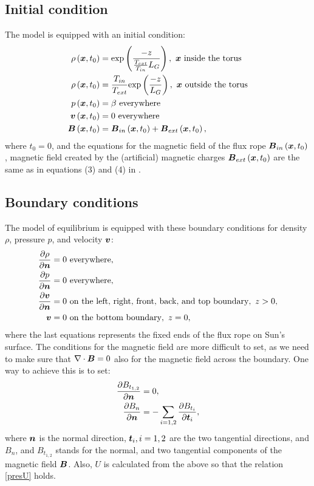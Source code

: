 \subsection{Initial condition}
The model is equipped with an initial condition:
\begin{align}
\label{tdIc}
\rho\left(\mbox{\boldmath $x$}, t_0\right) & = \mathrm{exp}\left(\frac{-z}{\frac{ T_{ext} }{T_{in}}L_G}\right),\ \mbox{\boldmath $x$}\ \text{inside the torus}\\
\rho\left(\mbox{\boldmath $x$}, t_0\right) & = \frac{ T_{in} }{T_{ext}} \mathrm{exp}\left(\frac{-z}{L_G}\right),\ \mbox{\boldmath $x$}\ \text{outside the torus}\\
p\left(\mbox{\boldmath $x$}, t_0\right) & = \beta\ \text{everywhere}\\
\mbox{\boldmath $v$}\left(\mbox{\boldmath $x$}, t_0\right) & = 0\ \text{everywhere}\\
\mbox{\boldmath $B$}\left(\mbox{\boldmath $x$}, t_0\right) & = \mbox{\boldmath $B$}_{in}\left(\mbox{\boldmath $x$}, t_0\right) + \mbox{\boldmath $B$}_{ext}\left(\mbox{\boldmath $x$}, t_0\right),
\end{align}
where $t_0 = 0$, and the equations for the magnetic field of the flux rope $\mbox{\boldmath $B$}_{in}\left(\mbox{\boldmath $x$}, t_0\right)$, magnetic field created by the (artificial) magnetic charges $\mbox{\boldmath $B$}_{ext}\left(\mbox{\boldmath $x$}, t_0\right)$ are the same as in equations (3) and (4) in \cite{miraClanek}.
\subsection{Boundary conditions}
The model of equilibrium is equipped with these boundary conditions for density $\rho$, pressure $p$, and velocity $\mbox{\boldmath $v$}$:
\begin{align}
\frac{\partial \rho}{\partial \mbox{\boldmath $n$}} & = 0\ \text{everywhere},\\
\frac{\partial p}{\partial \mbox{\boldmath $n$}} & = 0\ \text{everywhere},\\
\frac{\partial \mbox{\boldmath $v$}}{\partial \mbox{\boldmath $n$}} & = 0\ \text{on the left, right, front, back, and top boundary},\ z > 0,\\
\mbox{\boldmath $v$} & = 0\ \text{on the bottom boundary},\ z = 0,\\
\end{align}
where the last equations represents the fixed ends of the flux rope on Sun's surface.
The conditions for the magnetic field are more difficult to set, as we need to make sure that $\nabla \cdot \mbox{\boldmath $B$} = 0$ also for the magnetic field across the boundary.
One way to achieve this is to set:
\begin{align}
\frac{\partial B_{t_{1,2}}}{\partial \mbox{\boldmath $n$}} & = 0,\\
\frac{\partial B_n}{\partial \mbox{\boldmath $n$}} & = -\sum_{i = 1, 2}\frac{\partial B_{t_{i}}}{\partial \mbox{\boldmath $t$}_{i}},
\end{align}
where $\mbox{\boldmath $n$}$ is the normal direction, $\mbox{\boldmath $t$}_{i}, i = 1, 2$ are the two tangential directions, and $B_n$, and $B_{t_{1,2}}$ stands for the normal, and two tangential components of the magnetic field $\mbox{\boldmath $B$}$. Also, $U$ is calculated from the above so that the relation \cref{presU} holds.

